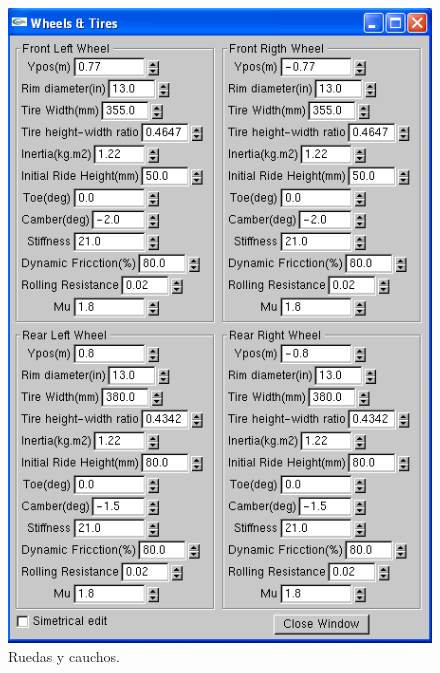 \begin{figure}[h]
\begin{minipage}[t]{0.5\linewidth}
\includegraphics[scale= 0.45,type=png,ext=.png,read=.png]{figures/c6}
\caption{Ruedas y cauchos.}
\label{fig:c6}
\end{minipage}
\end{figure} 